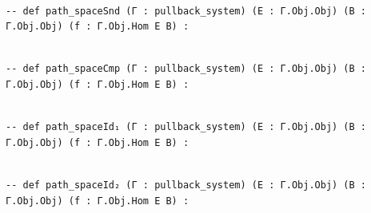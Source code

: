 \documentclass{book}
\theoremstyle{definition}
\newcounter{lcounter}
\begin{document}
\begin{center}
\begin{tcolorbox}[width=5in,colback={white},title={\begin{center}\texttt{Lean \thelcounter} \addtocounter{lcounter}{1}  \end{center}},colbacktitle=Blue,coltitle=black]
\begin{verbatim}

-- def path_spaceSnd (Γ : pullback_system) (E : Γ.Obj.Obj) (B : Γ.Obj.Obj) (f : Γ.Obj.Hom E B) :

\end{verbatim}
\end{tcolorbox}
\end{center}

\begin{center}
\begin{tcolorbox}[width=5in,colback={white},title={\begin{center}\texttt{Lean \thelcounter} \addtocounter{lcounter}{1}  \end{center}},colbacktitle=Blue,coltitle=black]
\begin{verbatim}

-- def path_spaceCmp (Γ : pullback_system) (E : Γ.Obj.Obj) (B : Γ.Obj.Obj) (f : Γ.Obj.Hom E B) :

\end{verbatim}
\end{tcolorbox}
\end{center}

\begin{center}
\begin{tcolorbox}[width=5in,colback={white},title={\begin{center}\texttt{Lean \thelcounter} \addtocounter{lcounter}{1}  \end{center}},colbacktitle=Blue,coltitle=black]
\begin{verbatim}

-- def path_spaceId₁ (Γ : pullback_system) (E : Γ.Obj.Obj) (B : Γ.Obj.Obj) (f : Γ.Obj.Hom E B) :

\end{verbatim}
\end{tcolorbox}
\end{center}

\begin{center}
\begin{tcolorbox}[width=5in,colback={white},title={\begin{center}\texttt{Lean \thelcounter} \addtocounter{lcounter}{1}  \end{center}},colbacktitle=Blue,coltitle=black]
\begin{verbatim}

-- def path_spaceId₂ (Γ : pullback_system) (E : Γ.Obj.Obj) (B : Γ.Obj.Obj) (f : Γ.Obj.Hom E B) :

\end{verbatim}
\end{tcolorbox}
\end{center}
\end{document}
